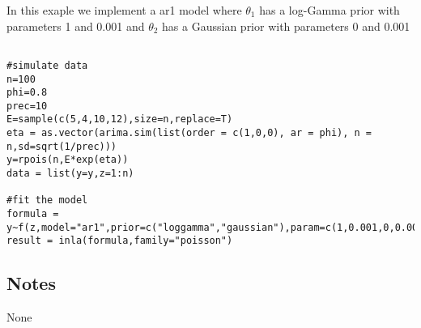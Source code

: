 \documentclass[a4paper,11pt]{article}
\begin{document}
In this exaple we implement a ar1 model where $\theta_1$ has a log-Gamma prior with parameters 1 and 0.001 and $\theta_2$ has a Gaussian prior with parameters 0 and 0.001
\begin{verbatim}

#simulate data
n=100
phi=0.8
prec=10
E=sample(c(5,4,10,12),size=n,replace=T)
eta = as.vector(arima.sim(list(order = c(1,0,0), ar = phi), n = n,sd=sqrt(1/prec)))
y=rpois(n,E*exp(eta))
data = list(y=y,z=1:n)

#fit the model
formula = y~f(z,model="ar1",prior=c("loggamma","gaussian"),param=c(1,0.001,0,0.001))
result = inla(formula,family="poisson") 
\end{verbatim}


\subsection*{Notes}

None
\end{document}
